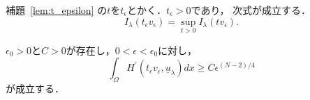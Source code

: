 \begin{nota}
 補題~\ref{lem:t_epsilon}
 の$t$を$t_\epsilon$とかく．$t_\epsilon > 0$であり，
 次式が成立する．
 \begin{equation}
  I_\lambda(t_\epsilon v_\epsilon) = \sup_{t > 0} I_\lambda(t
   v_\epsilon).
   \label{eq:t_epsilon}
 \end{equation}
\end{nota}

\begin{lem} \label{lem:intHprime}
 $\epsilon_0 > 0$と$C > 0$が存在し，$0 < \epsilon < \epsilon_0$に対し，
 \begin{equation}
  \int_\Omega H^\prime(t_\epsilon v_\epsilon, \underline{u}_\lambda)
   dx \geq C\epsilon^{(N-2)/4} \label{eq:int_Hprime}
 \end{equation}
 が成立する．
\end{lem}

